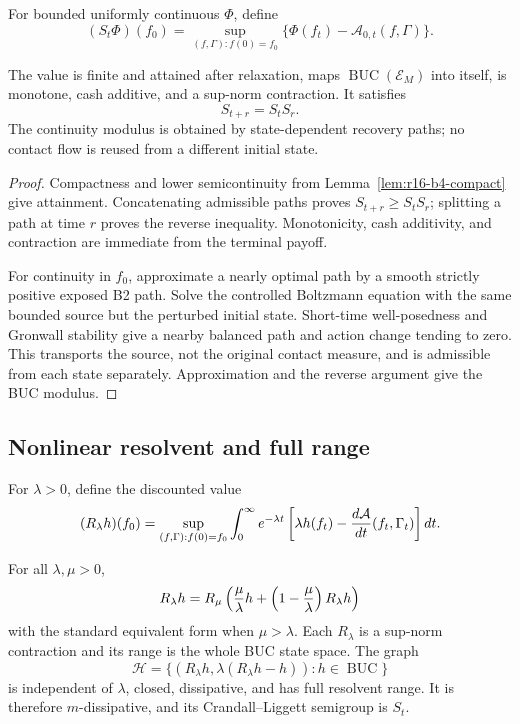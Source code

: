 For bounded uniformly continuous \(\Phi\), define
\[
 (S_t\Phi)(f_0)=
 \sup_{(f,\Gamma):f(0)=f_0}
 \{\Phi(f_t)-\mathcal A_{0,t}(f,\Gamma)\}.
\]

\begin{theorem}
\label{thm:r16-b4-nisio}
The value is finite and attained after relaxation, maps
\(\operatorname{BUC}(\mathcal E_M)\) into itself, is monotone, cash additive,
and a sup-norm contraction.  It satisfies
\[
 S_{t+r}=S_tS_r.
\]
The continuity modulus is obtained by state-dependent recovery paths; no
contact flow is reused from a different initial state.
\end{theorem}

\begin{proof}
Compactness and lower semicontinuity from
Lemma~\ref{lem:r16-b4-compact} give attainment.  Concatenating admissible paths
proves \(S_{t+r}\ge S_tS_r\); splitting a path at time \(r\) proves the reverse
inequality.  Monotonicity, cash additivity, and contraction are immediate from
the terminal payoff.

For continuity in \(f_0\), approximate a nearly optimal path by a smooth
strictly positive exposed B2 path.  Solve the controlled Boltzmann equation
with the same bounded source but the perturbed initial state.  Short-time
well-posedness and Gronwall stability give a nearby balanced path and action
change tending to zero.  This transports the source, not the original contact
measure, and is admissible from each state separately.  Approximation and the
reverse argument give the BUC modulus.
\end{proof}

\subsection{Nonlinear resolvent and full range}

For \(\lambda>0\), define the discounted value
\[
 (R_\lambda h)(f_0)=
 \sup_{(f,\Gamma):f(0)=f_0}
 \int_0^\infty e^{-\lambda t}
 \left[\lambda h(f_t)-
 {d\mathcal A\over dt}(f_t,\Gamma_t)\right]dt.
\]

\begin{theorem}
\label{thm:r16-b4-resolvent}
For all \(\lambda,\mu>0\),
\[
 R_\lambda h
 =R_\mu\left({\mu\over\lambda}h+
   \left(1-{\mu\over\lambda}\right)R_\lambda h\right)
\]
with the standard equivalent form when \(\mu>\lambda\).  Each
\(R_\lambda\) is a sup-norm contraction and its range is the whole BUC state
space.  The graph
\[
 \mathscr H=
 \{(R_\lambda h,\lambda(R_\lambda h-h)):h\in\operatorname{BUC}\}
\]
is independent of \(\lambda\), closed, dissipative, and has full resolvent
range.  It is therefore \(m\)-dissipative, and its Crandall--Liggett semigroup
is \(S_t\).
\end{theorem}

